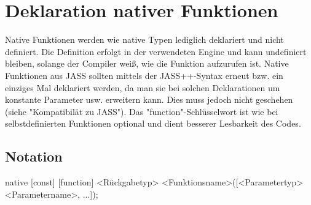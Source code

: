 \chapter{Deklaration nativer Funktionen}

Native Funktionen werden wie native Typen lediglich deklariert und nicht definiert. Die Definition erfolgt in der verwendeten Engine und kann
undefiniert bleiben, solange der Compiler weiß, wie die Funktion aufzurufen ist.
Native Funktionen aus JASS sollten mittels der JASS++-Syntax erneut bzw. ein einziges Mal deklariert werden, da man sie bei solchen Deklarationen
um konstante Parameter usw. erweitern kann.
Dies muss jedoch nicht geschehen (siehe "Kompatibilät zu JASS").
Das "function"-Schlüsselwort ist wie bei selbstdefinierten Funktionen optional und dient besserer Lesbarkeit des Codes.

\section{Notation}
native [const] [function] <Rückgabetyp> <Funktionsname>([<Parametertyp> <Parametername>, ...]);